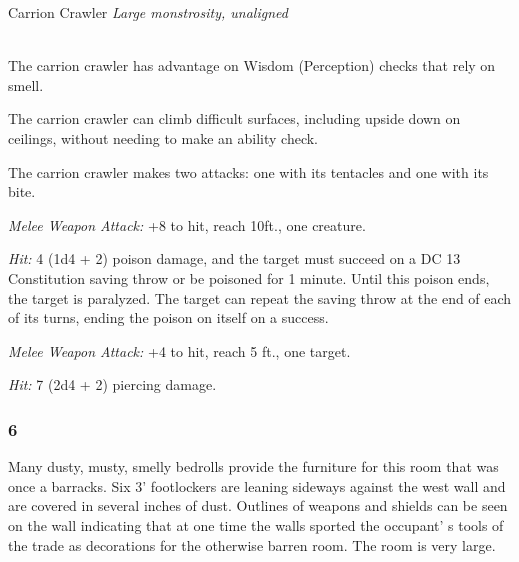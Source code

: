 \documentclass[palace_of_the_silver_princess]{subfiles}
\begin{document}
\begin{monsterbox}{Carrion Crawler}
    \textit{Large monstrosity, unaligned}\\
    \hline
    \basics[%
        armorclass = 13,
        hitpoints  = 25,
        speed      = {30 ft., climb 30 ft.}
    ]
    \hline
    \stats[
        STR = \stat{14},
        DEX = \stat{13},
        CON = \stat{16},
        INT = \stat{1},
        WIS = \stat{12},
        CHA = \stat{5}
    ]
    \hline
    \details[
        senses = {darkvision 60 ft., passive Perception 13},
        languages = {---},
        challenge = {2 (450 XP)},
    ]
    \hline
    \\[1mm]
    \begin{monsteraction}
        The carrion crawler has advantage on Wisdom (Perception) checks
        that rely on smell.
    \end{monsteraction}
    \begin{monsteraction}
        The carrion crawler can climb difficult surfaces, including
        upside down on ceilings, without needing to make an ability
        check.
    \end{monsteraction}
    \begin{monsteraction}[Multiattack]
        The carrion crawler makes two attacks: one with its tentacles
        and one with its bite.
    \end{monsteraction}

    \begin{monsteraction}[Tentacles]
        \textit{Melee Weapon Attack:} +8 to hit, reach 10ft., one
        creature. 

        \textit{Hit:} 4 (1d4 + 2) poison damage, and the target must
        succeed on a DC 13 Constitution saving throw or be poisoned for
        1 minute. Until this poison ends, the target is paralyzed. The
        target can repeat the saving throw at the end of each of its
        turns, ending the poison on itself on a success.
    \end{monsteraction}

    \begin{monsteraction}[Bite]
        \textit{Melee Weapon Attack:} +4 to hit, reach 5 ft., one
        target.

        \textit{Hit:} 7 (2d4 + 2) piercing damage.
    \end{monsteraction}
\end{monsterbox}

\subsubsection{6}
\begin{quotebox}
    Many dusty, musty, smelly bedrolls provide the furniture for this
    room that was once a barracks. Six 3’ footlockers are leaning
    sideways against the west wall and are covered in several inches of
    dust. Outlines of weapons and shields can be seen on the wall
    indicating that at one time the walls sported the occupant’ s tools
    of the trade as decorations for the otherwise barren room. The
    room is very large.
\end{quotebox}
\end{document}
